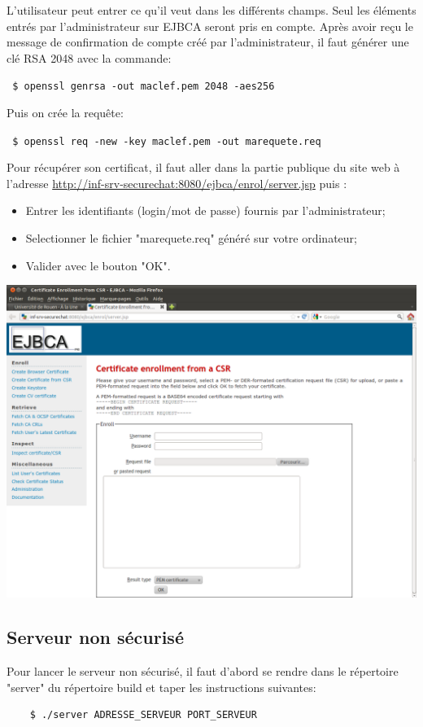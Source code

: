 \documentclass[a4paper,11pt,french]{book}
\begin{document}
L'utilisateur peut entrer ce qu'il veut dans les différents champs. Seul les éléments entrés par l'administrateur sur EJBCA seront pris en compte.
Après avoir reçu le message de confirmation de compte créé par l'administrateur, il faut générer une clé RSA 2048 avec la commande:

\verb+ $ openssl genrsa -out maclef.pem 2048 -aes256+

Puis on crée la requête:

\verb+ $ openssl req -new -key maclef.pem -out marequete.req+

Pour récupérer son certificat, il faut aller dans la partie publique du site web à l'adresse \url{http://inf-srv-securechat:8080/ejbca/enrol/server.jsp} puis :
\begin{itemize}
\item Entrer les identifiants (login/mot de passe) fournis par l'administrateur;
\item Selectionner le fichier "marequete.req" généré sur votre ordinateur;
\item Valider avec le bouton "OK".
\end{itemize}

\newpage
\includegraphics[scale=0.35]{capture/ejbca_cert.png}
\subsection{Serveur non sécurisé}
Pour lancer le serveur non sécurisé, il faut d'abord se rendre dans le répertoire "server" du répertoire build et taper les instructions suivantes:

\begin{verbatim}
    $ ./server ADRESSE_SERVEUR PORT_SERVEUR
\end{verbatim}
\end{document}
